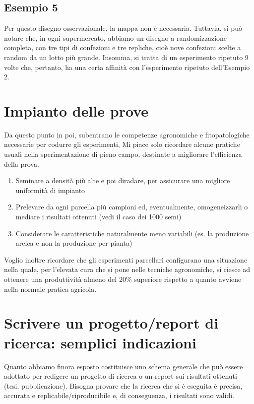 \documentclass[a4paper,12pt,oneside]{book}
\providecommand{\tightlist}{%
  \setlength{\itemsep}{0pt}\setlength{\parskip}{0pt}}
\theoremstyle{definition}
\theoremstyle{definition}
\theoremstyle{definition}
\theoremstyle{remark}
\begin{document}
\subsection{Esempio 5}\label{esempio-5-1}

Per questo disegno osservazionale, la mappa non è necessaria. Tuttavia,
si può notare che, in ogni supermercato, abbiamo un disegno a
randomizzazione completa, con tre tipi di confezioni e tre repliche,
cioè nove confezioni scelte a random da un lotto più grande. Insomma, si
tratta di un esperimento ripetuto 9 volte che, pertanto, ha una certa
affinità con l'esperimento ripetuto dell'Esempio 2.

\section{Impianto delle prove}\label{impianto-delle-prove}

Da questo punto in poi, subentrano le competenze agronomiche e
fitopatologiche necessarie per codurre gli esperimenti, Mi piace solo
ricordare alcune pratiche usuali nella sperimentazione di pieno campo,
destinate a migliorare l'efficienza della prova.

\begin{enumerate}
\def\labelenumi{\arabic{enumi}.}
\tightlist
\item
  Seminare a densità più alte e poi diradare, per assicurare una
  migliore uniformità di impianto
\item
  Prelevare da ogni parcella più campioni ed, eventualmente,
  omogeneizzarli o mediare i risultati ottenuti (vedi il caso dei 1000
  semi)
\item
  Considerare le caratteristiche naturalmente meno variabili (es. la
  produzione areica e non la produzione per pianta)
\end{enumerate}

Voglio inoltre ricordare che gli esperimenti parcellari configurano una
situazione nella quale, per l'elevata cura che si pone nelle tecniche
agronomiche, si riesce ad ottenere una produttività almeno del 20\%
superiore rispetto a quanto avviene nella normale pratica agricola.

\section{Scrivere un progetto/report di ricerca: semplici
indicazioni}\label{scrivere-un-progettoreport-di-ricerca-semplici-indicazioni}

Quanto abbiamo finora esposto costituisce uno schema generale che può
essere adottato per redigere un progetto di ricerca o un report sui
risultati ottenuti (tesi, pubblicazione). Bisogna provare che la ricerca
che si è eseguita è precisa, accurata e replicabile/riproducibile e, di
conseguenza, i risultati sono validi.
\end{document}
